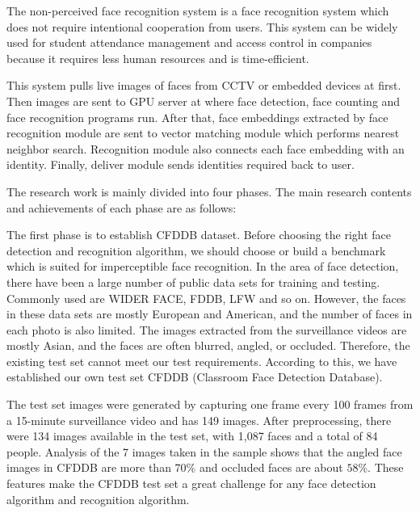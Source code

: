 \begin{bigabstract}

The non-perceived face recognition system is a face recognition system which does not require intentional cooperation from users. This system can be widely used for student attendance management and access control in companies because it requires less human resources and is time-efficient. 

This system pulls live images of faces from CCTV or embedded devices at first. Then images are sent to GPU server at where face detection, face counting and face recognition programs run. After that, face embeddings extracted by face recognition module are sent to vector matching module which performs nearest neighbor search. Recognition module also connects each face embedding with an identity. Finally, deliver module sends identities required back to user.

The research work is mainly divided into four phases. The main research contents and achievements of each phase are as follows:

The first phase is to establish CFDDB dataset. Before choosing the right face detection and recognition algorithm, we should choose or build a benchmark which is suited for imperceptible face recognition. In the area of face detection, there have been a large number of public data sets for training and testing. Commonly used are WIDER FACE\cite{yang2016wider}, FDDB\cite{fddbTech}, LFW\cite{huang2007labeled} and so on. However, the faces in these data sets are mostly European and American, and the number of faces in each photo is also limited. The images extracted from the surveillance videos are mostly Asian, and the faces are often blurred, angled, or occluded. Therefore, the existing test set cannot meet our test requirements. According to this, we have established our own test set CFDDB (Classroom Face Detection Database).

The test set images were generated by capturing one frame every 100 frames from a 15-minute surveillance video and has 149 images. After preprocessing, there were 134 images available in the test set, with 1,087 faces and a total of 84 people. Analysis of the 7 images taken in the sample shows that the angled face images in CFDDB are more than $70\%$ and occluded faces are about $58\%$. These features make the CFDDB test set a great challenge for any face detection algorithm and recognition algorithm.


\end{bigabstract}

